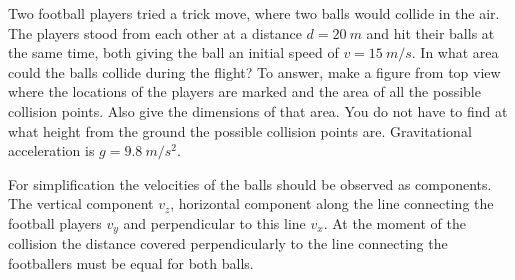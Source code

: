{\ifEngStatement
Two football players tried a trick move, where two balls would collide in the air. The players stood from each other at a distance $d = \SI{20}{m}$ and hit their balls at the same time, both giving the ball an initial speed of $v = \SI{15}{m/s}$. In what area could the balls collide during the flight? To answer, make a figure from top view where the locations of the players are marked and the area of all the possible collision points. Also give the dimensions of that area. You do not have to find at what height from the ground the possible collision points are. Gravitational acceleration is $g = \SI{9,8}{m/s^2}$.
\fi


\ifEngHint
For simplification the velocities of the balls should be observed as components. The vertical component $v_z$, horizontal component along the line connecting the football players $v_y$ and perpendicular to this line $v_x$. At the moment of the collision the distance covered perpendicularly to the line connecting the footballers must be equal for both balls.
\fi


}
